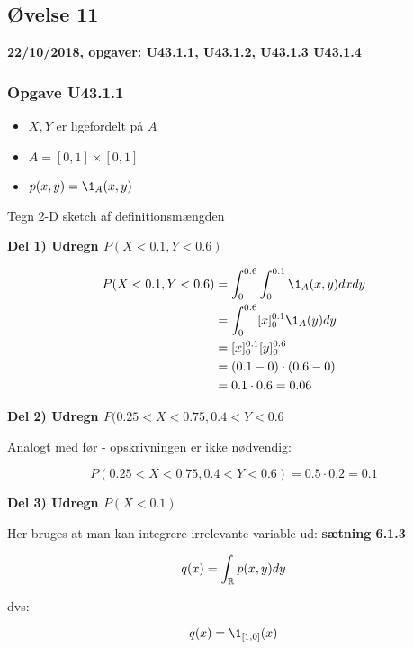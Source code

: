 \horizline

\subsection{Øvelse 11}

\textbf{22/10/2018, opgaver: U43.1.1, U43.1.2, U43.1.3 U43.1.4}

\subsubsection{Opgave U43.1.1}

\begin{itemize}
    \item $X, Y$ er ligefordelt på $A$
    \item $A = [0,1] \times [0,1]$
    \item $p(x,y) = \1_A(x,y)$
\end{itemize}

Tegn 2-D sketch af definitionsmængden

\textbf{Del 1) Udregn $P(X < 0.1, Y < 0.6)$}

\begin{align}
        P(X < 0.1, Y < 0.6) &= \int_0^{0.6} \int_0^{0.1} \1_A(x, y) dx dy \\
        &= \int_{0}^{0.6} [x]_{0}^{0.1} \1_A(y) dy \\
        &= [x]_{0}^{0.1} [y]_{0}^{0.6} \\
        &=(0.1 - 0) \cdot (0.6 - 0) \\
        &= 0.1 \cdot 0.6 = 0.06
\end{align}

\textbf{Del 2) Udregn $P(0.25< X < 0.75, 0.4 < Y < 0.6$}

Analogt med før - opskrivningen er ikke nødvendig:

\begin{equation}
    P(0.25 < X < 0.75, 0.4 < Y < 0.6) = 0.5 \cdot 0.2 = 0.1
\end{equation}

\textbf{Del 3) Udregn $P(X < 0.1)$}

Her bruges at man kan integrere irrelevante variable ud: \textbf{sætning 6.1.3}

\begin{equation}
    q(x) = \int_{\mathbb{R}} p(x,y) dy
\end{equation}

dvs:

\begin{equation}
    q(x) = \1_{[1,0]}(x)
\end{equation}

